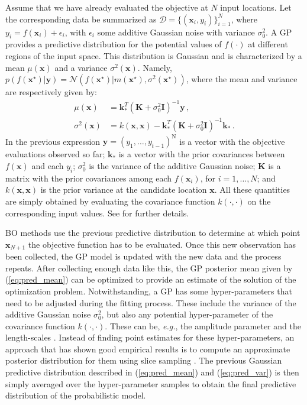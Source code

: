 Assume that we have already evaluated the objective at $N$ input locations. 
Let the corresponding data be summarized as $\mathcal{D}=\{(\mathbf{x}_i,y_i)\}_{i=1}^N$,
where $y_i = f(\mathbf{x}_i) + \epsilon_i$, with $\epsilon_i$ some additive Gaussian noise with variance $\sigma_0^2$.
A GP provides a predictive distribution for the potential values of $f(\cdot)$ at different regions
of the input space. This distribution is Gaussian 
and is characterized by a mean $\mu(\mathbf{x})$ and a variance 
$\sigma^2(\mathbf{x})$.  Namely, $p(f(\mathbf{x}^\star)|\mathbf{y}) =\mathcal{N}(f(\mathbf{x}^\star)|
m(\mathbf{x}^\star),  \sigma^2(\mathbf{x}^\star))$, where the mean and variance are respectively given by:
\begin{align}
\mu(\mathbf{x}) & = \mathbf{k}_{*}^{T} (\mathbf{K}+\sigma_{0}^{2}\mathbf{I})^{-1}\mathbf{y}\,, 
\label{eq:pred_mean}\\
\sigma^2(\mathbf{x}) & = k(\mathbf{x},\mathbf{x}) - \mathbf{k}_{*}^T(\mathbf{K}+\sigma_0^2\mathbf{I})^{-1}\mathbf{k}_*\,.
\label{eq:pred_var}
\end{align}
In the previous expression
$\mathbf{y}=(y_1,\ldots,y_{t-1})^\text{N}$ is a vector with the objective evaluations observed 
so far; $\mathbf{k}_*$ is a vector with the prior covariances between $f(\mathbf{x})$ and each $y_i$;
$\sigma_0^2$ is the variance of the additive Gaussian noise;
$\mathbf{K}$ is a matrix with the prior covariances among each $f(\mathbf{x}_i)$, for $i=1,\ldots,N$;
and $k(\mathbf{x},\mathbf{x})$ is the prior variance at the candidate location $\mathbf{x}$.
All these quantities are simply obtained by evaluating the covariance function $k(\cdot,\cdot)$ on the
corresponding input values. See \cite{rasmussen2003gaussian} for further details.

BO methods use the previous predictive distribution to determine at which point $\mathbf{x}_{N+1}$ 
the objective function has to be evaluated. Once this new observation has been collected, the GP
model is updated with the new data and the process repeats. After collecting enough data like this,
the GP posterior mean given by (\ref{eq:pred_mean}) can be optimized to provide an estimate of the 
solution of the optimization problem. Notwithstanding, a GP has some hyper-parameters that need to be 
adjusted during the fitting process. These include the variance of the additive Gaussian noise 
$\sigma_0^2$, but also any potential hyper-parameter of the covariance function $k(\cdot,\cdot)$. 
These can be, \emph{e.g.}, the amplitude parameter and the length-scales \citep{rasmussen2003gaussian}.  
Instead of finding point estimates for these hyper-parameters, an approach that has shown 
good empirical results is to compute an approximate posterior distribution for them using 
slice sampling \citep{snoek2013}. The previous Gaussian predictive distribution described in 
(\ref{eq:pred_mean}) and (\ref{eq:pred_var}) is then simply averaged over the hyper-parameter 
samples to obtain the final predictive distribution of the probabilistic model.

